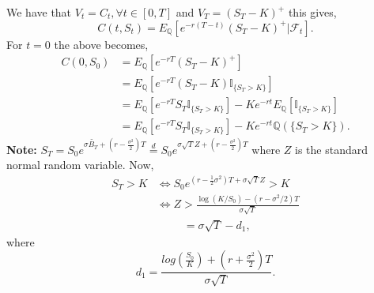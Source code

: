 \documentclass[12pt]{report}
\begin{document}
We have that $V_t = C_t , \forall t \in [0,T]$ and $V_T = (S_T - K)^{+}$ this gives, 
\begin{equation}
C(t,S_{t}) =E_{\mathbb{Q}}[e^{-r(T-t)} (S_{T}-K)^{+}|\mathcal{F}_{t}].
\end{equation}
For $t=0$ the above becomes,\\
\begin{align*}
  C(0,S_{0}) & =E_{\mathbb{Q}}[e^{-rT} (S_{T}-K)^{+}]\\            & =E_{\mathbb{Q}}[e^{-rT} (S_{T}-K) \mathbb{I}_{\{S_{T} > K\}}]\\
             & =E_{\mathbb{Q}}[e^{-rT} S_{T} \mathbb{I}_{\{S_{T} > K\}}] - K e^{-rt} E_{\mathbb{Q}} [\mathbb{I}_{\{S_{T} > K\}}]\\
             & =E_{\mathbb{Q}}[e^{-rT} S_{T} \mathbb{I}_{\{S_{T} > K\}}] - K e^{-rt} \mathbb{Q}(\{S_{T} > K\}).
\end{align*}
\textbf{Note:} $S_T =S_0 e^{\sigma \widetilde{ B_{T}}+(r-\frac{\sigma^{2}}{2})T} \stackrel{d}{=} S_0 e^{\sigma \sqrt{T} Z+(r-\frac{\sigma^{2}}{2})T} $ where $Z$ is the standard normal random variable. Now,\\
\begin{align*}
  S_T>K & \iff S_0 e^{(r -\frac{1}{2}\sigma^2)T + \sigma \sqrt{T}Z} > K  \\
  & \iff Z> \frac{\log(K/S_0)-(r-\sigma^2/2)T}{\sigma\sqrt{T}} \\
  & ~~~~~~~~~~~= \sigma\sqrt{T}-d_1,
\end{align*}
where $$ d_1 = \frac{log(\frac{S_{0}}{K}) + (r+\frac{\sigma^{2}}{2})T}{\sigma \sqrt{T}}.$$
\end{document}
